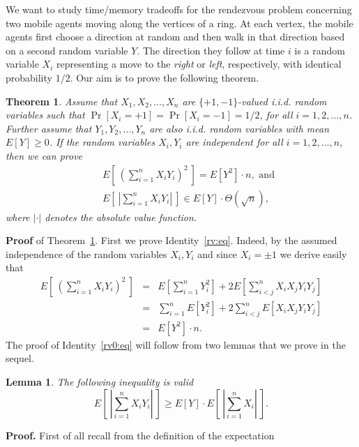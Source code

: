 \documentclass[12pt]{article}
\newtheorem{lemma}{Lemma}
\newtheorem{theorem}{Theorem}
\begin{document}
We want to study time/memory tradeoffs for
the rendezvous problem concerning
two mobile agents moving along the vertices of
a ring. At each vertex, the mobile agents first
choose a direction at random and then walk in that 
direction based on a second random variable $Y$.
The direction they follow at time $i$ is
a random variable 
$X_i$ representing a move to the {\em right} or {\em left},
respectively, with identical probability $1/2$.  
Our aim is to prove the following theorem.
\begin{theorem}
\label{thm}
Assume that $X_1, X_2, \ldots , X_n$ are $\{ +1 , -1\}$-valued
i.i.d. random variables such that 
$\Pr [X_i = +1 ] = \Pr [X_i = -1 ]  =1/2$, for
all $i=1,2,\ldots ,n$. Further assume that
$Y_1, Y_2, \ldots , Y_n$ are also i.i.d. random variables with
mean $E[Y] \geq 0$. If the random variables
$X_i, Y_i$ are independent for all $i=1,2,\ldots ,n$, then
we can prove
\begin{eqnarray}
& ~ &
\label{rv:eq}
E\left[ ~\left( \sum_{i=1}^n X_i Y_i \right)^2 ~ \right]
= E[Y^2 ] \cdot n  , \mbox{ and }\\
& ~ &
\label{rv0:eq}
E\left[ ~\left| \sum_{i=1}^n X_i Y_i \right| ~ \right]
\in E[Y] \cdot \Theta (\sqrt{n} ) , 
\end{eqnarray}
where $| \cdot |$ denotes the absolute value function.
\end{theorem}
{\bf Proof} of Theorem~\ref{thm}.
First we prove Identity~\ref{rv:eq}. Indeed, by the assumed independence
of the random variables $X_i, Y_i$ and since $X_i = \pm 1$ we derive easily that
\begin{eqnarray*}
E\left[ ~\left( \sum_{i=1}^n X_i Y_i \right)^2 ~ \right]
& = &
E\left[ \sum_{i=1}^n Y_i^2  \right] +
2 E\left[ \sum_{i <j}^n X_i X_jY_i  Y_j \right] \\
& = &
\sum_{i=1}^n E[Y_i^2 ] 
+ 2 \sum_{i <j}^n E[X_i X_jY_i  Y_j]  \\
& = &
E[Y^2 ] \cdot n .
\end{eqnarray*}
The proof of Identity~\ref{rv0:eq}
will follow from two lemmas that we prove in the sequel.
\begin{lemma}
\label{lm1}
The following inequality is valid
\begin{equation}
\label{rv1:eq}
E\left[ ~\left| \sum_{i=1}^n X_i Y_i \right| ~ \right] \geq 
E[Y] \cdot E\left[ ~\left| \sum_{i=1}^n X_i \right| ~\right] .
\end{equation}
\end{lemma}
{\bf Proof.}
First of all recall from the definition of the expectation 
\end{document}
